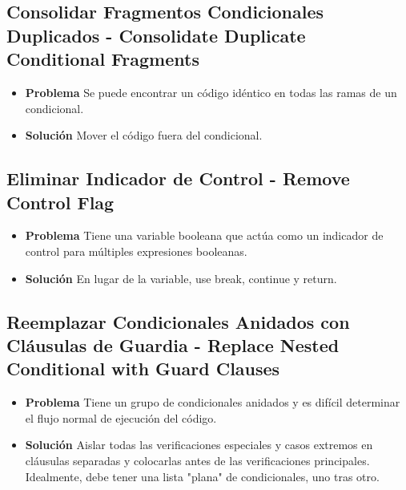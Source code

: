 \documentclass[11pt,a4paper,oneside]{book}
\begin{document}
\subsection{Consolidar Fragmentos Condicionales Duplicados - Consolidate Duplicate Conditional Fragments} 
\begin{itemize}
    \item \textbf{Problema} Se puede encontrar un código idéntico en todas las ramas de un condicional.
    
    
    
    \item \textbf{Solución} Mover el código fuera del condicional.
    
    
\end{itemize}
    
\subsection{Eliminar Indicador de Control - Remove Control Flag} 
 \begin{itemize}
    \item \textbf{Problema} Tiene una variable booleana que actúa como un indicador de control para múltiples expresiones booleanas.
    \item \textbf{Solución} En lugar de la variable, use break, continue y return.
\end{itemize}
    
\subsection{Reemplazar Condicionales Anidados con Cláusulas de Guardia - Replace Nested Conditional with Guard Clauses}     
 \begin{itemize}
    \item \textbf{Problema} Tiene un grupo de condicionales anidados y es difícil determinar el flujo normal de ejecución del código.
    
    
    
    \item \textbf{Solución} Aislar todas las verificaciones especiales y casos extremos en cláusulas separadas y colocarlas antes de las verificaciones principales. Idealmente, debe tener una lista "plana" de condicionales, uno tras otro.
    
    
\end{itemize}
    
\end{document}
